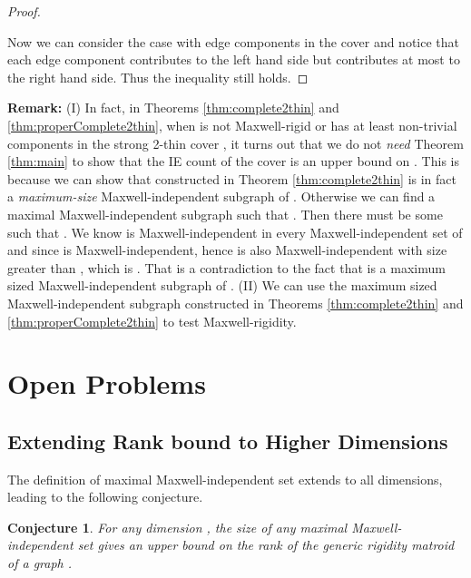 \documentclass[10pt]{article}
\newtheorem{conjecture}{Conjecture}
\begin{document}
\begin{proof}
\begin{description}
\begin{comment}
Moreover, we can obtain that for every , every maximal Maxwell-independent subgraph  of  contains . 
Otherwise, we can consider the component  whose  does not  and from Lemma \ref{obs:maximal}(\ref{obs:maximal2}), we know   , a contradiction.

The rest of the proof is the same as the proof of Theorem \ref{thm:complete2thin}.



\end{comment}
\end{description}


Now we can consider the case with edge components in the cover and notice that each edge component contributes  to the left hand side but contributes at most  to the right hand side. Thus the inequality still holds.
\end{proof}



\noindent
{\bf Remark:}
(I) In fact, in Theorems \ref{thm:complete2thin} and \ref{thm:properComplete2thin}, when  is not Maxwell-rigid or  has at least  non-trivial components
in the strong 2-thin cover , it turns out that we do not {\em need}
Theorem \ref{thm:main} to show that the IE count
of the cover  is an upper bound on . This is because we can show that  constructed in Theorem
\ref{thm:complete2thin} is in fact a {\em maximum-size} Maxwell-independent subgraph
of . Otherwise we can find a maximal Maxwell-independent subgraph
 such that . Then there must be some  such
that . We know  is Maxwell-independent in
every Maxwell-independent set of  and since  is
Maxwell-independent, hence  is also
Maxwell-independent with size greater than , which is
. That is a contradiction to the fact that  is a maximum sized
Maxwell-independent subgraph of . (II) We can use the maximum sized Maxwell-independent subgraph  constructed in Theorems \ref{thm:complete2thin} and \ref{thm:properComplete2thin} to test Maxwell-rigidity.




\section{Open Problems}
\label{conclusion}

\subsection{Extending Rank bound to Higher Dimensions}\label{sec:higher}

The definition of maximal Maxwell-independent set extends to all dimensions, leading to the following conjecture.
\begin{conjecture}\label{conj:kdim}
For any dimension , the size of any maximal Maxwell-independent set gives an upper bound on the rank of the generic rigidity matroid of a graph .
\end{conjecture}
\end{document}
